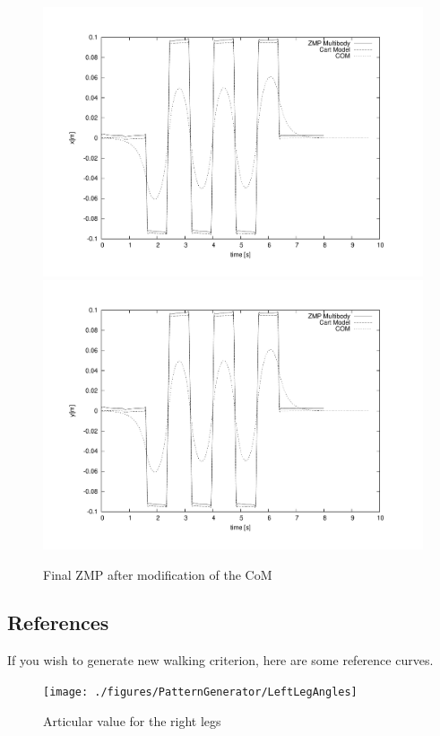 \begin{figure}[htb]
\begin{center}
\includegraphics[width=\linewidth]{./figures/PatternGenerator/ThirdFigureZMPMB_X}
\includegraphics[width=\linewidth]{./figures/PatternGenerator/ThirdFigureZMPMB_Y}
\caption{Final ZMP after modification of the CoM}
\label{pic:ZMPMBcompensated}
\end{center}
\end{figure}
\clearpage

\subsection{References}
If you wish to generate new walking criterion, here are some reference curves.
\begin{figure}[htb]
\begin{center}
\texttt{[image: ./figures/PatternGenerator/LeftLegAngles]}
\caption{Articular value for the right legs}
\label{pic:ZMPMBcompensated}
\end{center}
\end{figure}

